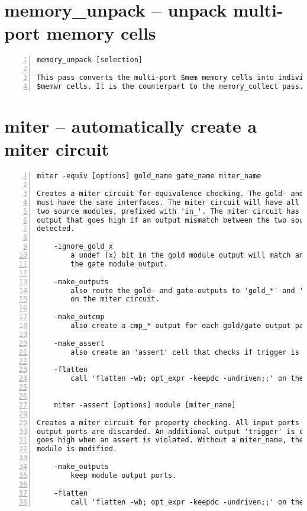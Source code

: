 \section{memory\_unpack -- unpack multi-port memory cells}
\label{cmd:memory_unpack}
\begin{lstlisting}[numbers=left,frame=single]
    memory_unpack [selection]

This pass converts the multi-port $mem memory cells into individual $memrd and
$memwr cells. It is the counterpart to the memory_collect pass.
\end{lstlisting}

\section{miter -- automatically create a miter circuit}
\label{cmd:miter}
\begin{lstlisting}[numbers=left,frame=single]
    miter -equiv [options] gold_name gate_name miter_name

Creates a miter circuit for equivalence checking. The gold- and gate- modules
must have the same interfaces. The miter circuit will have all inputs of the
two source modules, prefixed with 'in_'. The miter circuit has a 'trigger'
output that goes high if an output mismatch between the two source modules is
detected.

    -ignore_gold_x
        a undef (x) bit in the gold module output will match any value in
        the gate module output.

    -make_outputs
        also route the gold- and gate-outputs to 'gold_*' and 'gate_*' outputs
        on the miter circuit.

    -make_outcmp
        also create a cmp_* output for each gold/gate output pair.

    -make_assert
        also create an 'assert' cell that checks if trigger is always low.

    -flatten
        call 'flatten -wb; opt_expr -keepdc -undriven;;' on the miter circuit.


    miter -assert [options] module [miter_name]

Creates a miter circuit for property checking. All input ports are kept,
output ports are discarded. An additional output 'trigger' is created that
goes high when an assert is violated. Without a miter_name, the existing
module is modified.

    -make_outputs
        keep module output ports.

    -flatten
        call 'flatten -wb; opt_expr -keepdc -undriven;;' on the miter circuit.
\end{lstlisting}

